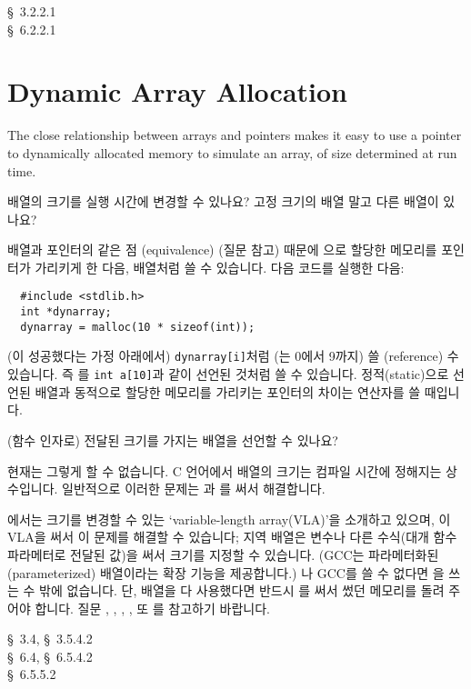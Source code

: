 \begin{faq}

\R
	\cite{ansi} \S\ 3.2.2.1 \\
	\cite{c89} \S\ 6.2.2.1
\end{faq}

\section{Dynamic Array Allocation}
The close relationship between arrays and pointers makes it easy to use a
pointer to dynamically allocated memory to simulate an array, of size
determined at run time.

\begin{faq}
	배열의 크기를 실행 시간에 변경할 수 있나요?
	고정 크기의 배열 말고 다른 배열이 있나요?

\A
	배열과 포인터의 같은 점 (equivalence) (질문  참고) 때문에
	으로 할당한
	메모리를 포인터가 가리키게 한 다음, 배열처럼 쓸 수 있습니다.
	다음 코드를 실행한 다음:
\begin{verbatim}
  #include <stdlib.h>
  int *dynarray;
  dynarray = malloc(10 * sizeof(int));
\end{verbatim}
	\noindent (이 성공했다는 가정 아래에서) 
	\verb+dynarray[i]+처럼 (는 0에서 9까지) 쓸 (reference) 수
	있습니다.
	즉 를 \verb+int a[10]+과 같이 선언된 것처럼 쓸 수
	있습니다.  정적(static)으로 선언된 배열과 동적으로 할당한 메모리를
	가리키는 포인터의 차이는  연산자를 쓸 때입니다.
\end{faq}

\begin{faq}
	(함수 인자로) 전달된 크기를 가지는 배열을 선언할 수 있나요?

\A
	현재는 그렇게 할 수 없습니다.  C 언어에서 배열의 크기는
	컴파일 시간에 정해지는 상수입니다.
	일반적으로 이러한 문제는 과 를 써서 해결합니다.

	\cite{c9x}에서는 크기를 변경할 수 있는
	`variable-length array(VLA)'을 소개하고 있으며, 이 VLA을 써서
	이 문제를 해결할 수 있습니다; 지역 배열은 변수나 다른 수식(대개
	함수 파라메터로 전달된 값)을 써서 크기를 지정할 수 있습니다.
	(GCC는 파라메터화된(parameterized) 배열이라는 확장 기능을
	제공합니다.) \cite{c9x}나 GCC를 쓸 수 없다면 을 쓰는 수
	밖에 없습니다.  단, 배열을 다 사용했다면 반드시 를 써서
	썼던 메모리를 돌려 주어야 합니다.
	질문 , , , , 또 를
	참고하기 바랍니다.

\R
	\cite{ansi} \S\ 3.4, \S\ 3.5.4.2 \\
	\cite{c89} \S\ 6.4, \S\ 6.5.4.2 \\
	\cite{c9x} \S\ 6.5.5.2
\end{faq}


